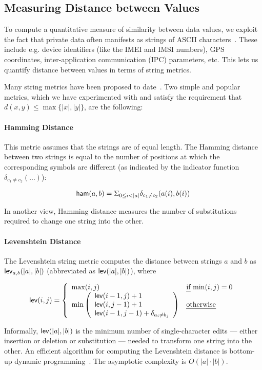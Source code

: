 \subsection{Measuring Distance between Values}\label{Se:similarstr}

To compute a quantitative measure of similarity between data values, we exploit the fact that private data often manifests as strings of ASCII characters~\cite{EGCCJMS:OSDI10,HHJSW:CCS11,YYZGNW:CCS13}. These include e.g. device identifiers (like the IMEI and IMSI numbers), GPS coordinates, inter-application communication (IPC) parameters, etc. This lets us quantify distance between values in terms of string metrics.

Many string metrics have been proposed to date~\cite{PS:BIS07}. Two simple and popular metrics, which we have experimented with and satisfy the requirement that
$d(x,y) \leq \max \{ |x|,|y| \}$, are the following:

\paragraph{Hamming Distance} This metric assumes that the strings are of equal length. The Hamming distance between two strings is equal to the number of positions at which the corresponding symbols are different (as indicated by the indicator function $\delta_{c_1 \neq c_2}(\ldots)$):
\begin{small}
$$
{\sf ham}(a,b) = \Sigma_{0 \leq i < |a|} \delta_{c_1 \neq c_2}(a(i),b(i))
$$
\end{small}
In another view, Hamming distance measures the number of substitutions required to change one string into the other.

\paragraph{Levenshtein Distance} The Levenshtein string metric computes the distance between strings $a$ and $b$ as ${\sf lev}_{a,b}(|a|,|b|)$
(abbreviated as ${\sf lev}(|a|,|b|)$), where
\begin{small}
$$
{\sf lev}(i,j) = \left\{
  \begin{array}{l l}
   \max(i,j)				& \text{\emph{if} $\min(i,j)=0$} \\
   \min \left( {\begin{array}{l}
   		{\sf lev}(i-1,j) + 1 \\
		{\sf lev}(i,j-1) + 1 \\
		{\sf lev}(i-1,j-1) + \delta_{a_i \neq b_j} \\
   	   \end{array}} \right) & \text{\emph{otherwise}} \\
   \end{array} \right.
$$
\end{small}
Informally, ${\sf lev}(|a|,|b|)$ is the minimum number of single-character edits --- either insertion or deletion or substitution --- needed to transform one string into the other. An efficient algorithm for computing the Levenshtein distance is bottom-up dynamic programming~\cite{WF:JACM74}. The asymptotic complexity is $O(|a| \cdot |b|)$.

